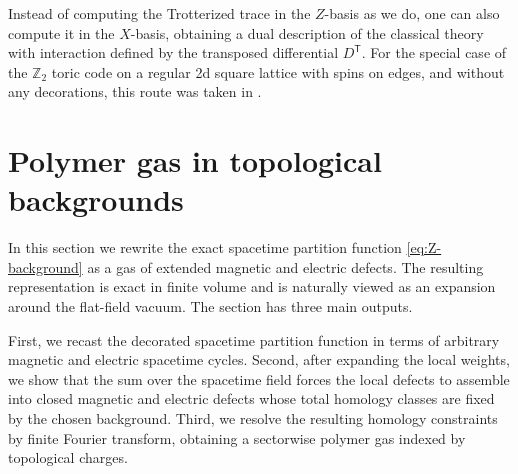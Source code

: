 \begin{remark}
	Instead of computing the Trotterized trace in the $Z$-basis as we do, one can also compute it in the $X$-basis, obtaining a dual description of the classical theory with interaction defined by the transposed differential $D^\mathsf{T}$. For the special case of the $\mathbb Z_2$ toric code on a regular 2d square lattice with spins on edges, and without any decorations, this route was taken in \cite{Timmerman:2022uin}.
\end{remark}





\section{Polymer gas in topological backgrounds}
\label{sec:fixed-charge-polymer-gas}

In this section we rewrite the exact spacetime partition function
\eqref{eq:Z-background} as a gas of extended magnetic and electric defects. The resulting
representation is exact in finite volume and is naturally viewed as an expansion around the
flat-field vacuum. The section has three main outputs.

First, we recast the decorated spacetime partition function in terms of arbitrary magnetic
and electric spacetime cycles. Second, after expanding the local weights, we show that the
sum over the spacetime field forces the local defects to assemble into closed magnetic and
electric defects whose total homology classes are fixed by the chosen background. Third, we
resolve the resulting homology constraints by finite Fourier transform, obtaining a
sectorwise polymer gas indexed by topological charges.

